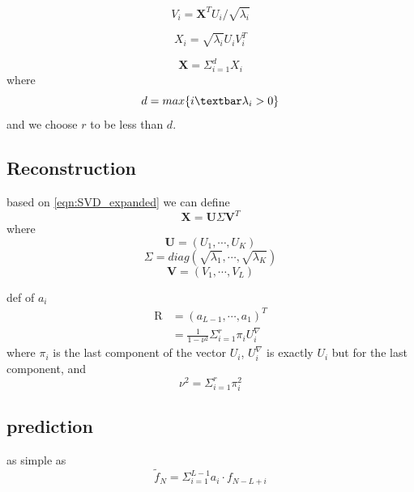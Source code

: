 \documentclass[a4paper]{article}
\begin{document}
\begin{equation}
	\label{eqn:V_i}
	V_i = \textbf{X}^T U_i / \sqrt{\lambda_i}
\end{equation}

\begin{equation}
	\label{eqn:X_i}
	\textbf{$X_i$} = \sqrt{\lambda_i} U_i V_i^T
\end{equation}

\begin{equation}
	\label{eqn:SVD_expanded}
	\textbf{X} = \Sigma_{i=1}^d \textbf{$X_i$}
\end{equation}
where
\begin{equation}
	\label{eqn:non-zero-char-d}
	d = max\{i \textbar \lambda_i > 0\}
\end{equation}
and we choose $r$ to be less than $d$.

\subsection{Reconstruction}
based on \ref{eqn:SVD_expanded} we can define
\begin{equation}
	\label{eqn:SVD}
	\textbf{X} = \textbf{U} \Sigma \textbf{V}^T
\end{equation}
where
\begin{equation}
	\label{eqn:SVD_U}
	\textbf{U} = (U_1, \cdots, U_K)
\end{equation}
\begin{equation}
	\label{eqn:SVD_Sigma}
	\Sigma = diag(\sqrt{\lambda_1}, \cdots, \sqrt{\lambda_K})
\end{equation}
\begin{equation}
	\label{eqn:SVD_V} 
	\textbf{V} = (V_1, \cdots, V_L)
\end{equation}

def of $a_i$
\begin{align}
	\textrm{R} &= (a_{L-1}, \cdots, a_1)^T \\
	           &= \frac{1}{1-\nu^2} \Sigma_{i=1}^r \pi_i U_i^\nabla \label{eqn:R_a}
\end{align}
where $\pi_i$ is the last component of the vector $U_i$, $U_i^\nabla$ is exactly $U_i$ but for the last component, and
\begin{equation}
	\label{eqn:ssa_nu^2}
	\nu^2 = \Sigma_{i=1}^r \pi_i^2
\end{equation}

\subsection{prediction}
as simple as
\begin{equation}
	\label{eqn:ssa_prediction}
	\tilde{f}_N = \Sigma_{i=1}^{L-1} a_i \cdot f_{N-L+i} 
\end{equation}
\end{document}
